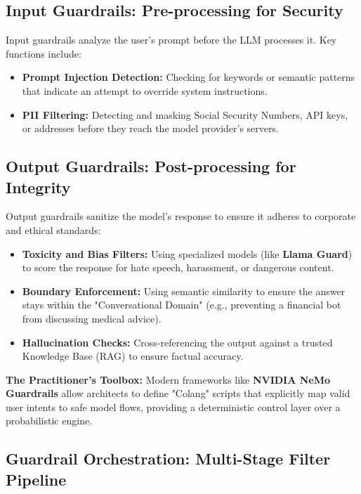 \subsection{Input Guardrails: Pre-processing for Security}
Input guardrails analyze the user's prompt before the LLM processes it. Key functions include:
\begin{itemize}
    \item \textbf{Prompt Injection Detection:} Checking for keywords or semantic patterns that indicate an attempt to override system instructions.
    \item \textbf{PII Filtering:} Detecting and masking Social Security Numbers, API keys, or addresses before they reach the model provider's servers.
\end{itemize}

\subsection{Output Guardrails: Post-processing for Integrity}
Output guardrails sanitize the model's response to ensure it adheres to corporate and ethical standards:
\begin{itemize}
    \item \textbf{Toxicity and Bias Filters:} Using specialized models (like \textbf{Llama Guard}) to score the response for hate speech, harassment, or dangerous content.
    \item \textbf{Boundary Enforcement:} Using semantic similarity to ensure the answer stays within the "Conversational Domain" (e.g., preventing a financial bot from discussing medical advice).
    \item \textbf{Hallucination Checks:} Cross-referencing the output against a trusted Knowledge Base (RAG) to ensure factual accuracy.
\end{itemize}

\begin{svgraybox}
\textbf{The Practitioner's Toolbox:} Modern frameworks like \textbf{NVIDIA NeMo Guardrails} allow architects to define "Colang" scripts that explicitly map valid user intents to safe model flows, providing a deterministic control layer over a probabilistic engine.
\end{svgraybox}

\subsection{Guardrail Orchestration: Multi-Stage Filter Pipeline}
\label{subsec:guardrail_orchestration}

